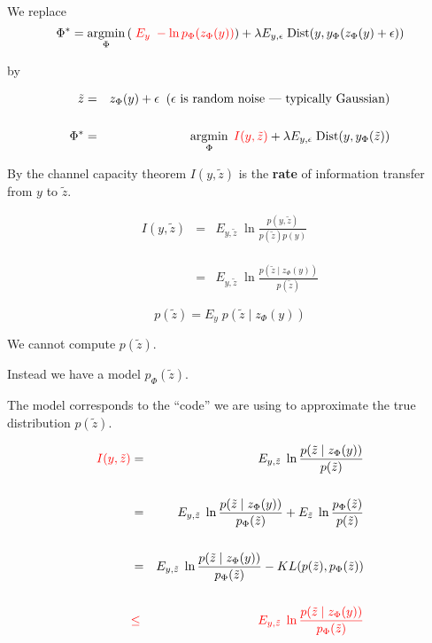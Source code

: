 {

We replace
\vfill
\vfill
$$\Phi^* = \operatorname*{argmin}_\Phi \left(\;{\color{red} E_y\;- \ln p_\Phi(z_\Phi(y))}\right) + \lambda E_{y,\epsilon}\; \mathrm{Dist}(y,y_\Phi(z_\Phi(y) + \epsilon))$$

by

\begin{eqnarray*}
\tilde{z} & = & z_\Phi(y) + \epsilon \;\;\mbox{($\epsilon$ is random noise --- typically Gaussian)} \\
\\
\Phi^* & = & \operatorname*{argmin}_\Phi \;{\color{red} I(y,\tilde{z})} + \lambda E_{y,\epsilon}\; \mathrm{Dist}(y,y_\Phi(\tilde{z}))
\end{eqnarray*}

\vfill
By the channel capacity theorem {\color{red} $I(y,\tilde{z})$} is the {\bf rate} of information transfer from $y$ to $\tilde{z}$.


\begin{eqnarray*}
I(y,\tilde{z})  & = & E_{y,\tilde{z}}\; \ln \frac{p(y,\tilde{z})}{p(\tilde{z})p(y)} \\
\\
\\
\\
& = & E_{y,\tilde{z}}\;\ln \frac{p(\tilde{z}\;|\;z_\Phi(y))}{p(\tilde{z})}
\end{eqnarray*}


$$p(\tilde{z}) = E_y\;p(\tilde{z}\;|\;z_\Phi(y))$$

\vfill
We cannot compute $p(\tilde{z})$.

\vfill
Instead we have a model $p_\Phi(\tilde{z})$.

\vfill
The model corresponds to the ``code'' we are using to approximate the true distribution $p(\tilde{z})$.


\begin{eqnarray*}
{\color{red} I(y,\tilde{z})}  & = & E_{y,\tilde{z}}\;\ln \frac{p(\tilde{z}\;|\;z_\Phi(y))}{p(\tilde{z})} \\
\\
& = & E_{y,\tilde{z}}\;\ln \frac{p(\tilde{z}\;|\;z_\Phi(y))}{p_\Phi(\tilde{z})} + E_{\tilde{z}}\;\ln\frac{p_\Phi(\tilde{z})}{p(\tilde{z})} \\
\\
& = & E_{y,\tilde{z}}\;\ln \frac{p(\tilde{z}\;|\;z_\Phi(y))}{p_\Phi(\tilde{z})} - KL(p(\tilde{z}),p_\Phi(\tilde{z})) \\
\\
& {\color{red} \leq} & {\color{red} E_{y,\tilde{z}}\;\ln \frac{p(\tilde{z}\;|\;z_\Phi(y))}{p_\Phi(\tilde{z})}}
\end{eqnarray*}


}
